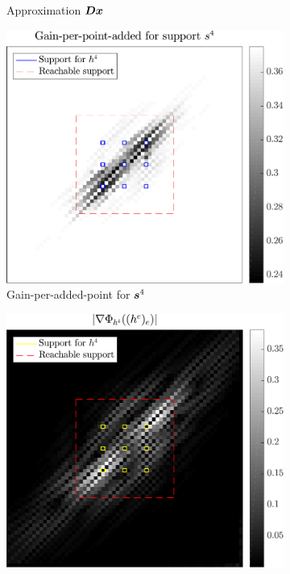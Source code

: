 \begin{figure}[!ht]
\begin{subfigure}[b]{0.49\linewidth}
\caption{Approximation $\bm{D}\bm{x}$} \label{fig_gain_n4_approx}
\end{subfigure}
\begin{subfigure}[b]{0.49\linewidth}\centering
\includegraphics[width=\linewidth]{figures/xp/n4/xp_128x128_sc2_angl1_K3_S3_node4_objmatrix.pdf}
\caption{Gain-per-added-point for $\bm{s}^4$}
\end{subfigure}
\begin{subfigure}[b]{0.49\linewidth}\centering
\includegraphics[width=\linewidth]{figures/xp/n4/xp_128x128_sc2_angl1_K3_S3_node4_partgrad4.pdf}

\end{subfigure}
\end{figure}
